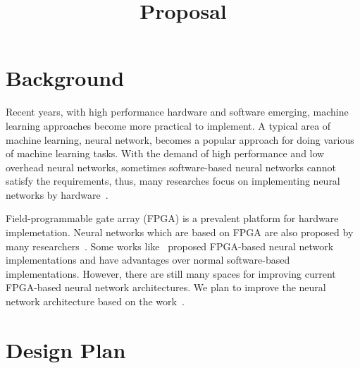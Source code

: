 \documentclass[conference]{IEEEtran}
\begin{document}
\title{Proposal}

\author{
\and
{}
}

\maketitle

\section{Background}

Recent years, with high performance hardware and software emerging, machine learning approaches become more practical to implement. A typical area of machine learning, neural network, becomes a popular approach for doing various of machine learning tasks. With the demand of high performance and low overhead neural networks, sometimes software-based neural networks cannot satisfy the requirements, thus, many researches focus on implementing neural networks by hardware~\cite{hwsurvey}. 

Field-programmable gate array (FPGA) is a prevalent platform for hardware implemetation. Neural networks which are based on FPGA are also proposed by many researchers~\cite{FPGAbook}. Some works like~\cite{hytnh17,seok02} proposed FPGA-based neural network implementations and have advantages over normal software-based implementations. However, there are still many spaces for improving current FPGA-based neural network architectures. We plan to improve the neural network architecture based on the work~\cite{hytnh17}.

\section{Design Plan}
\end{document}
